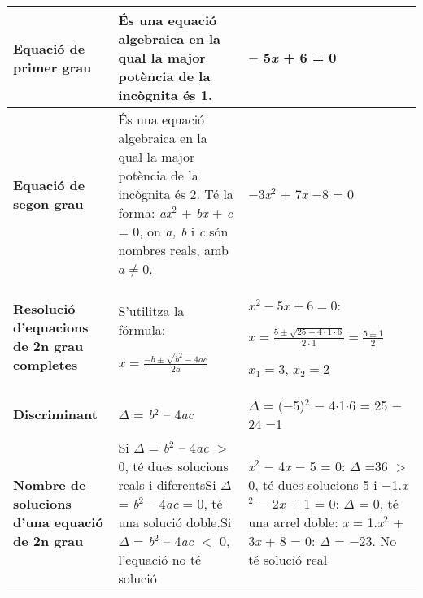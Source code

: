 \pagebreak
\vspace*{-1cm}
\resum
\begin{center}
	\renewcommand{\arraystretch}{1.1}

\begin{longtable}{|P{0.2\textwidth}|p{0.38\textwidth}|p{0.38\textwidth}|} \hline 
	
\textbf{Equació de primer grau} & És una equació algebraica en la qual la major potència de la incògnita és 1. & $-$ 5\textit{x} + 6 = 0\textit{} \\ \hline 

\textbf{Equació de segon grau} & És una equació algebraica en la qual la major potència de la incògnita és 2. Té la forma: \textit{ax}${}^{2}$ + \textit{bx} + \textit{c} = 0, on \textit{a, b } i \textit{ c} són nombres reals, amb $a\neq 0$. & $-$3\textit{x}${}^{2}$ + 7\textit{x} $-$8 = 0 \\ \hline

 \textbf{Resolució d'equacions de 2n grau completes} & S'utilitza la fórmula:\par $x=\frac{-b\pm \sqrt{b^{2} -4ac} }{2a} $ & $x^2-5x+6=0$:\par  $x=\frac{5\pm \sqrt{25-4\cdot 1\cdot 6} }{2\cdot 1} =\frac{5\pm 1}{2} $ \par $x_1=3$, $x_2=2$ \\ \hline

 \textbf{Discriminant} & $\Delta$ = \textit{b}${}^{2}$\textit{ }-- 4\textit{ac} & $\Delta$ = ($-$5)${}^{2}$ $-$ 4$\cdot$1$\cdot$6 = 25 $-$24 =1 \\  \hline 

\textbf{Nombre de solucions d'una equació de 2n grau} & Si $\Delta$  = \textit{b}${}^{2}$\textit{ }-- 4\textit{ac} $>$ 0, té dues solucions reals i diferents\newline Si $\Delta$  = \textit{b}${}^{2}$\textit{ }-- 4\textit{ac} = 0, té una solució doble.\newline Si $\Delta$  = \textit{b}${}^{2}$\textit{ }-- 4\textit{ac} $<$ 0, l'equació no té solució & \textit{x}${}^{2}$ $-$ 4\textit{x} $-$ 5 = 0: $\Delta$ =36 $>$ 0, té dues solucions 5 i $-$1.\newline \textit{x}${}^{2}$ $-$ 2\textit{x} + 1 = 0: $\Delta$ = 0, té una arrel doble: \textit{x} = 1.\newline \textit{x}${}^{2}$ + 3\textit{x} + 8 = 0: $\Delta$ = $-$23. No té solució real \\ \hline 


\end{longtable}
\end{center}
